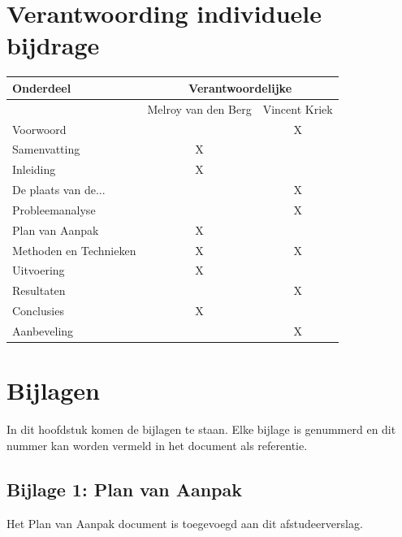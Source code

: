 \documentclass[]{article}
\begin{document}
\newpage
\section{Verantwoording individuele bijdrage}
\label{lastpage}

\begin{tabular}{|| l | c | c ||}\hline
    Onderdeel              &   \multicolumn{2}{|c||}{Verantwoordelijke} \\\hline
                           & Melroy van den Berg & Vincent Kriek        \\\hline\hline
    Voorwoord              &                     &  X                   \\\hline
    Samenvatting           &       X             &                      \\\hline
    Inleiding              &       X             &                      \\\hline
    De plaats van de...    &                     &  X                   \\\hline
    Probleemanalyse        &                     &  X                   \\\hline
    Plan van Aanpak        &       X             &                      \\\hline
    Methoden en Technieken &       X             &  X                   \\\hline
    Uitvoering             &       X             &                      \\\hline
    Resultaten             &                     &  X                   \\\hline
    Conclusies             &       X             &                      \\\hline
    Aanbeveling            &                     &  X                   \\\hline
\end{tabular}              

\newpage
\pagestyle{empty}
\section{Bijlagen}

In dit hoofdstuk komen de bijlagen te staan. Elke bijlage is genummerd en
dit nummer kan worden vermeld in het document als referentie.

\subsection{Bijlage 1: Plan van Aanpak}
Het Plan van Aanpak document is toegevoegd aan dit afstudeerverslag.
\end{document}
